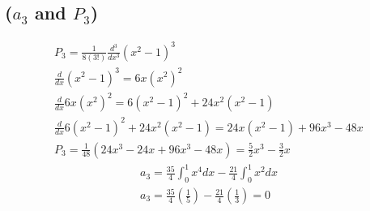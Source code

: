 \documentclass{article}
\begin{document}
\subsection*{\textbf{($a_3$ and $P_3$)}}
\begin{equation}
\begin{aligned}
P_3 = \frac{1}{8(3!)}\frac{d^3}{dx^3}(x^2-1)^3\\
\frac{d}{dx}(x^2-1)^3 = 6x(x^2)^2\\
\frac{d}{dx}6x(x^2)^2 = 6(x^2-1)^2 + 24x^2(x^2-1)\\
\frac{d}{dx}6(x^2-1)^2 + 24x^2(x^2-1) = 24x(x^2-1) + 96x^3-48x\\
P_3 = \frac{1}{48}(24x^3 - 24x +96x^3-48x)= \frac{5}{2}x^3 - \frac{3}{2}x
\end{aligned}
\end{equation}
\begin{equation}
\begin{aligned}
a_3 = \frac{35}{4}\int_0^1x^4dx - \frac{21}{4}\int_0^1x^2dx\\
a_3 = \frac{35}{4}(\frac{1}{5}) - \frac{21}{4}(\frac{1}{3}) = 0
\end{aligned}
\end{equation}
\end{document}

